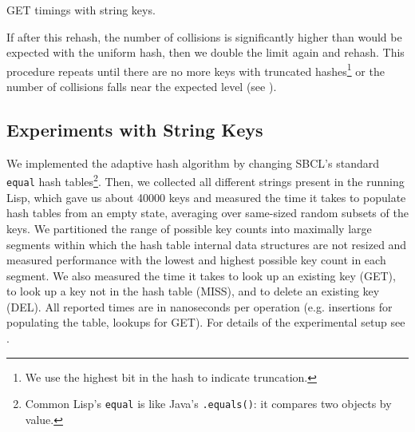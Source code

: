 \documentclass[sigconf]{acmart}
\newcommand*\lisp[1]{\texttt{#1}}
\renewcommand{\label}[1]{%
    \gdef\sfname{sf:##1}}%
\begin{document}
\begin{sourcefigure}[t]
\caption{GET timings with string keys.}
\Description{}
\label{fig:string-existing-get}
\end{sourcefigure}

If after this rehash, the number of collisions is significantly higher than would be expected with the uniform hash, then we double the limit again and rehash.
This procedure repeats until there are no more keys with truncated hashes\footnote{We use the highest bit in the hash to indicate truncation.} or the number of collisions falls near the expected level (see ).

\subsection{Experiments with String Keys}
\label{sec:experiments-with-string-keys}

We implemented the adaptive hash algorithm by changing SBCL's standard \lisp{equal} hash tables\footnote{Common Lisp's \lisp{equal} is like Java's \texttt{.equals()}: it compares two objects by value.}.
Then, we collected all different strings present in the running Lisp, which gave us about \num{40000} keys and measured the time it takes to populate hash tables from an empty state, averaging over same-sized random subsets of the keys.
We partitioned the range of possible key counts into maximally large segments within which the hash table internal data structures are not resized and measured performance with the lowest and highest possible key count in each segment.
We also measured the time it takes to look up an existing key (GET), to look up a key not in the hash table (MISS), and to delete an existing key (DEL).
All reported times are in nanoseconds per operation (e.g. insertions for populating the table, lookups for GET).
For details of the experimental setup see .
\end{document}
